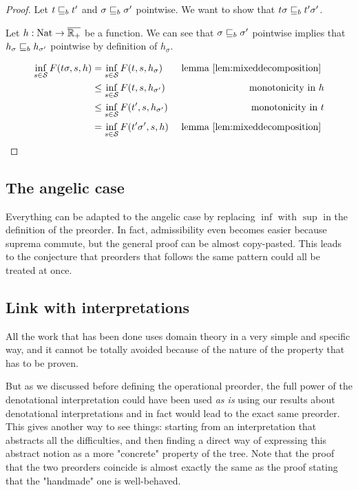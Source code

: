 \begin{ensps}
    \begin{proof}
        Let $t \sqsubseteq_b t'$ and $\sigma \sqsubseteq_b \sigma'$ pointwise.
        We want to show that $t\sigma \sqsubseteq_b t' \sigma'$. 

        Let $h : \textnormal{Nat} \to \overline{\mathbb{R}_+}$ be a function.
        We can see that $\sigma \sqsubseteq_b \sigma'$ pointwise 
        implies that $h_\sigma \sqsubseteq_b h_{\sigma'}$ pointwise 
        by definition of $h_\sigma$.


        \begin{align*}
            \inf_{s \in \mathcal{S}} F(t\sigma, s, h)  
            &= \inf_{s \in \mathcal{S}} F(t, s, h_\sigma) 
            &\text{ lemma \ref{lem:mixeddecomposition} } \\
            &\leq \inf_{s \in \mathcal{S}} F(t, s, h_{\sigma'})  & \text{ monotonicity in } h\\
            &\leq \inf_{s \in \mathcal{S}} F(t',s, h_{\sigma'}) & \text{ monotonicity in } t \\
            &= \inf_{s \in \mathcal{S}} F(t'\sigma', s,h )
            &\text{ lemma \ref{lem:mixeddecomposition} } \\
        \end{align*}

    \end{proof}
\end{ensps}

\subsection{The angelic case}

Everything can be adapted to the angelic case by replacing 
$\inf$ with $\sup$ in the definition of the preorder. In fact,
admissibility even becomes easier because suprema commute, 
but the general proof can be almost copy-pasted.
This leads to the conjecture that preorders that 
follows the same pattern could all be treated at once.

\subsection{Link with interpretations}

All the work that has been done uses domain theory in a very 
simple and specific way, and it cannot be totally avoided 
because of the nature of the property that has to be proven.

But as we discussed before defining the operational preorder,
the full power of the denotational interpretation could have 
been used \emph{as is} using our results about denotational
interpretations and in fact would lead to the exact same preorder.
This gives another way to see things: starting from 
an interpretation that abstracts all the difficulties,
and then finding a direct way of expressing this 
abstract notion as a more "concrete" property of the tree.
Note that the proof that the two preorders coincide 
is almost exactly the same as the proof stating that 
the "handmade" one is well-behaved.

